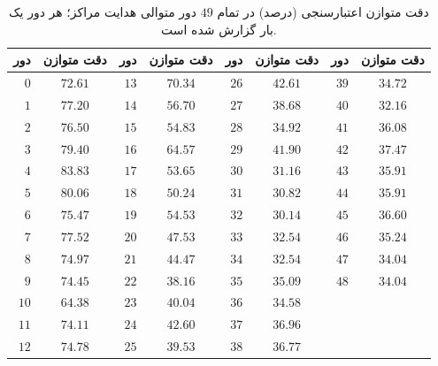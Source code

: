 \begin{table}[htbp]
\centering\scriptsize
\caption{دقت متوازن اعتبارسنجی (درصد) در تمام $49$ دور متوالی هدایت مراکز؛ هر دور یک بار گزارش شده است.}
\label{tab:ch4-center-trajectory-validation-49}
\begin{tabular}{rcrcrcrc}\hline
دور & دقت متوازن & دور & دقت متوازن & دور & دقت متوازن & دور & دقت متوازن\\\hline
$0$ & $72.61$ & $13$ & $70.34$ & $26$ & $42.61$ & $39$ & $34.72$\\
$1$ & $77.20$ & $14$ & $56.70$ & $27$ & $38.68$ & $40$ & $32.16$\\
$2$ & $76.50$ & $15$ & $54.83$ & $28$ & $34.92$ & $41$ & $36.08$\\
$3$ & $79.40$ & $16$ & $64.57$ & $29$ & $41.90$ & $42$ & $37.47$\\
$4$ & $83.83$ & $17$ & $53.65$ & $30$ & $31.16$ & $43$ & $35.91$\\
$5$ & $80.06$ & $18$ & $50.24$ & $31$ & $30.82$ & $44$ & $35.91$\\
$6$ & $75.47$ & $19$ & $54.53$ & $32$ & $30.14$ & $45$ & $36.60$\\
$7$ & $77.52$ & $20$ & $47.53$ & $33$ & $32.54$ & $46$ & $35.24$\\
$8$ & $74.97$ & $21$ & $44.47$ & $34$ & $32.54$ & $47$ & $34.04$\\
$9$ & $74.45$ & $22$ & $38.16$ & $35$ & $35.09$ & $48$ & $34.04$\\
$10$ & $64.38$ & $23$ & $40.04$ & $36$ & $34.58$ &  & \\
$11$ & $74.11$ & $24$ & $42.60$ & $37$ & $36.96$ &  & \\
$12$ & $74.78$ & $25$ & $39.53$ & $38$ & $36.77$ &  & \\
\hline
\end{tabular}
\end{table}
